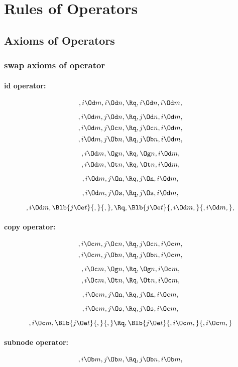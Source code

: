 
 \chapter{Rules of Operators}

\section{Axioms of Operators}

\subsection{swap axioms of operator}
\subsubsection{id operator:}
\[,i \Od m, i \Od n, \Rq ,i \Od n, i \Od m,\]

\[,i \Od m, j \Od n, \Rq ,j \Od n, i \Od m,\]
\[,i \Od m, j \Oc n, \Rq ,j \Oc n, i \Od m,\]
\[,i \Od m, j \Ob n, \Rq ,j \Ob n, i \Od m,\]

\[,i \Od m,  \Og n, \Rq , \Og n, i \Od m,\]
\[,i \Od m,  \Ot n, \Rq , \Ot n, i \Od m,\]

\[,i \Od m, j \On, \Rq , j \On, i \Od m,\]

\[,i \Od m, j \Os, \Rq , j \Os, i \Od m,\]

\[,i \Od m, \Blb{j \Oe t}{,}{,}, \Rq , \Blb{j \Oe t}{,i \Od m,}{,i \Od m,},\]





\bigskip
\subsubsection{copy operator:}
\[,i \Oc m, j \Oc n, \Rq ,j \Oc n, i \Oc m,\]
\[,i \Oc m, j \Ob n, \Rq ,j \Ob n, i \Oc m,\]

\[,i \Oc m,  \Og n, \Rq , \Og n, i \Oc m,\]
\[,i \Oc m,  \Ot n, \Rq , \Ot n, i \Oc m,\]

\[,i \Oc m, j \On, \Rq , j \On, i \Oc m,\]

\[,i \Oc m, j \Os, \Rq , j \Os, i \Oc m,\]

\[,i \Oc m, \Blb{j \Oe t}{,}{,} \Rq , \Blb{j \Oe t}{,i \Oc m,}{,i \Oc m,}\]



\bigskip
\subsubsection{subnode operator:}
\[,i \Ob m, j \Ob n, \Rq ,j \Ob n, i \Ob m,\]

